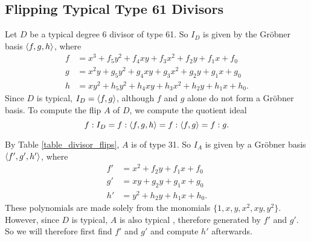 
\subsection{Flipping Typical Type 61 Divisors}

Let $D$ be a typical degree 6 divisor of type 61.
So $I_D$ is given by the Gr\"obner basis $\left\langle f,g,h \right\rangle$, where
\begin{align*}
  f  &= x^3  + f_5y^2 + f_4xy + f_3x^2 + f_2y + f_1x + f_0 \\
  g  &= x^2y + g_5y^2 + g_4xy + g_3x^2 + g_2y + g_1x + g_0 \\
  h  &= xy^2 + h_5y^2 + h_4xy + h_3x^2 + h_2y + h_1x + h_0.
\end{align*}
Since $D$ is typical, $I_D = \left\langle f,g \right\rangle$, although $f$ and $g$ alone do not form a Gr\"obner basis.
To compute the flip $A$ of $D$, we compute the quotient ideal
  \[ f : I_D = f : \left\langle f,g,h \right\rangle = f : \left\langle f,g \right\rangle = f : g. \]

By Table \ref{table_divisor_flips}, $A$ is of type 31.
So $I_A$ is given by a Gr\"obner basis $\left\langle f',g',h' \right\rangle$, where
\begin{align*}
  f' &= x^2 + f_2y + f_1x + f_0 \\
  g' &=  xy + g_2y + g_1x + g_0 \\
  h' &= y^2 + h_2y + h_1x + h_0.
\end{align*}
These polynomials are made solely from the monomials $\{1, x, y, x^2, xy, y^2\}$.
However, since $D$ is typical, $A$ is also typical ,
therefore generated by $f'$ and $g'$.
So we will therefore first find $f'$ and $g'$ and compute $h'$ afterwards.

